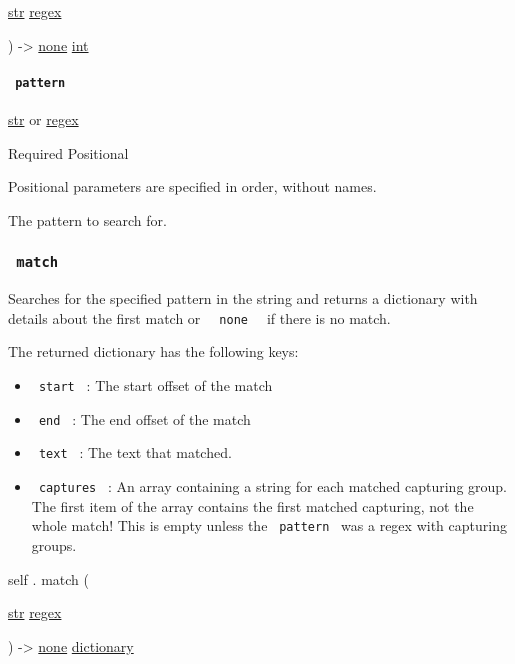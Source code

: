 { \href{/docs/reference/foundations/str/}{str}
\href{/docs/reference/foundations/regex/}{regex} }

) -\textgreater{} \href{/docs/reference/foundations/none/}{none}
\href{/docs/reference/foundations/int/}{int}

\paragraph{\texorpdfstring{\texttt{\ pattern\ }}{ pattern }}\label{definitions-position-pattern}

\href{/docs/reference/foundations/str/}{str} {or}
\href{/docs/reference/foundations/regex/}{regex}

{Required} {{ Positional }}

\label{definitions-position-pattern-positional-tooltip}
Positional parameters are specified in order, without names.

The pattern to search for.

\subsubsection{\texorpdfstring{\texttt{\ match\ }}{ match }}\label{definitions-match}

Searches for the specified pattern in the string and returns a
dictionary with details about the first match or
\texttt{\ }{\texttt{\ none\ }}\texttt{\ } if there is no match.

The returned dictionary has the following keys:

\begin{itemize}
\tightlist
\item
  \texttt{\ start\ } : The start offset of the match
\item
  \texttt{\ end\ } : The end offset of the match
\item
  \texttt{\ text\ } : The text that matched.
\item
  \texttt{\ captures\ } : An array containing a string for each matched
  capturing group. The first item of the array contains the first
  matched capturing, not the whole match! This is empty unless the
  \texttt{\ pattern\ } was a regex with capturing groups.
\end{itemize}

self { . } { match } (

{ \href{/docs/reference/foundations/str/}{str}
\href{/docs/reference/foundations/regex/}{regex} }

) -\textgreater{} \href{/docs/reference/foundations/none/}{none}
\href{/docs/reference/foundations/dictionary/}{dictionary}

